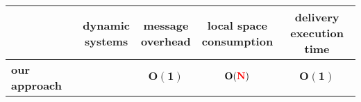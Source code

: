 \small
\begin{tabularx}{0.95\columnwidth}{@{}Xcccc@{}}
  & \makecell{dynamic\\systems} & \makecell{message\\overhead} & \makecell{local space\\consumption} &  \makecell{delivery\\execution time} \\%
  \hline\hline
  \textbf{our approach} & \textbf{\YES{\cmark}} & $\mathbf{O(1)}$ & $\mathbf{O(\textcolor{red}{N})}$ & $\mathbf{O(1)}$ \\ 
\end{tabularx}

